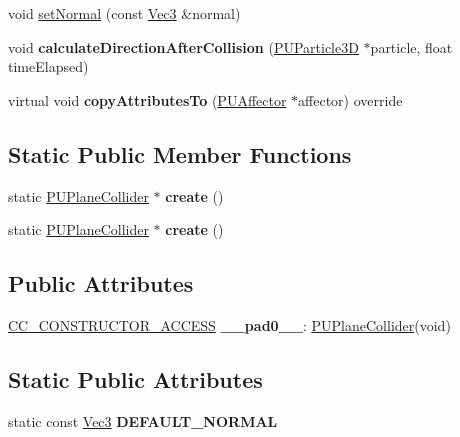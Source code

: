 \begin{DoxyCompactItemize}
void \hyperlink{classPUPlaneCollider_a527e29896ed1c6a741dad6225ba650b5}{set\+Normal} (const \hyperlink{classVec3}{Vec3} \&normal)
\item 
\mbox{\label{classPUPlaneCollider_ae1db8e838bd51116e32d02859216f384}} 
void {\bfseries calculate\+Direction\+After\+Collision} (\hyperlink{structPUParticle3D}{P\+U\+Particle3D} $\ast$particle, float time\+Elapsed)
\item 
\mbox{\label{classPUPlaneCollider_a47ee86b35bdb19c9cd292f472334cba5}} 
virtual void {\bfseries copy\+Attributes\+To} (\hyperlink{classPUAffector}{P\+U\+Affector} $\ast$affector) override
\end{DoxyCompactItemize}
\subsection*{Static Public Member Functions}
\begin{DoxyCompactItemize}
\item 
\mbox{\label{classPUPlaneCollider_a07c33155b9758122f020e5a0761e0816}} 
static \hyperlink{classPUPlaneCollider}{P\+U\+Plane\+Collider} $\ast$ {\bfseries create} ()
\item 
\mbox{\label{classPUPlaneCollider_a646148be3d23897c531300ca0aa1f4e8}} 
static \hyperlink{classPUPlaneCollider}{P\+U\+Plane\+Collider} $\ast$ {\bfseries create} ()
\end{DoxyCompactItemize}
\subsection*{Public Attributes}
\begin{DoxyCompactItemize}
\item 
\mbox{\label{classPUPlaneCollider_aa8a060a53b39968945a43968c473a379}} 
\hyperlink{_2cocos2d_2cocos_2base_2ccConfig_8h_a25ef1314f97c35a2ed3d029b0ead6da0}{C\+C\+\_\+\+C\+O\+N\+S\+T\+R\+U\+C\+T\+O\+R\+\_\+\+A\+C\+C\+E\+SS} {\bfseries \+\_\+\+\_\+pad0\+\_\+\+\_\+}\+: \hyperlink{classPUPlaneCollider}{P\+U\+Plane\+Collider}(void)
\end{DoxyCompactItemize}
\subsection*{Static Public Attributes}
\begin{DoxyCompactItemize}
\item 
\mbox{\label{classPUPlaneCollider_a9c2bc5fd8cc7ee3a4c95a8125bfbd565}} 
static const \hyperlink{classVec3}{Vec3} {\bfseries D\+E\+F\+A\+U\+L\+T\+\_\+\+N\+O\+R\+M\+AL}
\end{DoxyCompactItemize}

